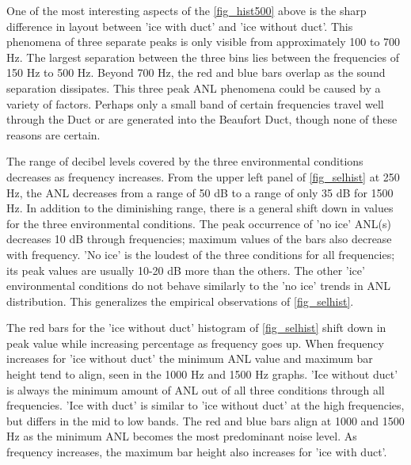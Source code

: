 One of the most interesting aspects of the \autoref{fig_hist500} above is the sharp difference in layout between 'ice with duct' and 'ice without duct'. This phenomena of three separate peaks is only visible from approximately 100 to 700 Hz. The largest separation between the three bins lies between the frequencies of 150 Hz to 500 Hz. Beyond 700 Hz, the red and blue bars overlap as the sound separation dissipates. This three peak ANL phenomena could be caused by a variety of factors. Perhaps only a small band of certain frequencies travel well through the Duct or are generated into the Beaufort Duct, though none of these reasons are certain.

The range of decibel levels covered by the three environmental conditions decreases as frequency increases. From the upper left panel of \autoref{fig_selhist} at 250 Hz, the ANL decreases from a range of 50 dB to a range of only 35 dB for 1500 Hz. In addition to the diminishing range, there is a general shift down in values for the three environmental conditions. The peak occurrence of 'no ice' ANL(s) decreases 10 dB through frequencies; maximum values of the bars also decrease with frequency. 'No ice' is the loudest of the three conditions for all frequencies; its peak values are usually 10-20 dB more than the others. The other 'ice' environmental conditions do not behave similarly to the 'no ice' trends in ANL distribution. This generalizes the empirical observations of \autoref{fig_selhist}. 


The red bars for the 'ice without duct' histogram of \autoref{fig_selhist} shift down in peak value while increasing percentage as frequency goes up. When frequency increases for 'ice without duct' the minimum ANL value and maximum bar height tend to align, seen in the 1000 Hz and 1500 Hz graphs. 'Ice without duct' is always the minimum amount of ANL out of all three conditions through all frequencies. 'Ice with duct' is similar to 'ice without duct' at the high frequencies, but differs in the mid to low bands. The red and blue bars align at 1000 and 1500 Hz as the minimum ANL becomes the most predominant noise level. As frequency increases, the maximum bar height also increases for 'ice with duct'.


